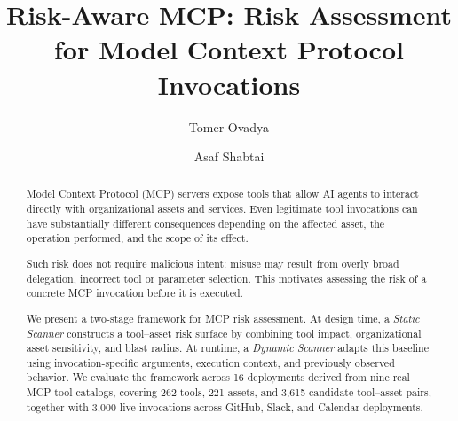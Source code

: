 \documentclass[sigconf]{acmart}
\newcommand{\stub}[1]{\textit{\textcolor{gray}{[To be written: #1]}}}
\begin{document}
\title{Risk-Aware MCP: Risk Assessment for Model Context Protocol Invocations}

\author{Tomer Ovadya}

\author{Asaf Shabtai}

\renewcommand{\shortauthors}{Ovadya and Shabtai}

\begin{abstract}

Model Context Protocol (MCP) servers expose tools that allow AI agents to interact directly with organizational assets and services. Even legitimate tool invocations can have substantially different consequences depending on the affected asset, the operation performed, and the scope of its effect.


Such risk does not require malicious intent: misuse may result from overly broad delegation, incorrect tool or parameter selection. This motivates assessing the risk of a concrete MCP invocation before it is executed.

We present a two-stage framework for MCP risk assessment. At design time, a \textit{Static Scanner} constructs a tool--asset risk surface by combining tool impact, organizational asset sensitivity, and blast radius. At runtime, a \textit{Dynamic Scanner} adapts this baseline using invocation-specific arguments, execution context, and previously observed behavior. We evaluate the framework across 16 deployments derived from nine real MCP tool catalogs, covering 262 tools, 221 assets, and 3,615 candidate tool--asset pairs, together with 3,000 live invocations across GitHub, Slack, and Calendar deployments.


\end{abstract}
\end{document}
